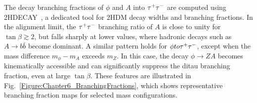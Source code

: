 The decay branching fractions of $\phi$ and $A$ into $\tau^+\tau^-$ are computed using \textsc{2HDECAY}~\cite{2HDECAY}, a dedicated tool for \ac{2HDM} decay widths and branching fractions. In the alignment limit, the $\tau^+\tau^-$ branching ratio of $A$ is close to unity for $\tan\beta \gtrsim 2$, but falls sharply at lower values, where hadronic decays such as $A \to b\bar{b}$ become dominant. A similar pattern holds for $\phi to \tau^+\tau^-$, except when the mass difference $m_\phi - m_A$ exceeds $m_Z$. In this case, the decay $\phi \to ZA$ becomes kinematically accessible and can significantly suppress the ditau branching fraction, even at large $\tan\beta$. These features are illustrated in Fig.~\ref{Figure:Chapter6_BranchingFractions}, which shows representative branching fraction maps for selected mass configurations. 

